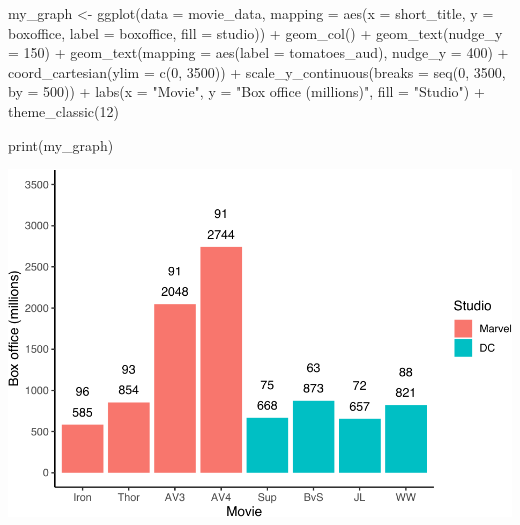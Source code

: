 \documentclass[
]{krantz}
\makeatletter
\newenvironment{Shaded}{\begin{snugshade}}{\end{snugshade}}
\newcommand{\AttributeTok}[1]{\textcolor[rgb]{0.61,0.61,0.61}{#1}}
\newcommand{\DecValTok}[1]{\textcolor[rgb]{0.06,0.06,0.06}{#1}}
\newcommand{\FunctionTok}[1]{\textcolor[rgb]{0,0,0}{#1}}
\newcommand{\NormalTok}[1]{#1}
\newcommand{\OtherTok}[1]{\textcolor[rgb]{0.37,0.37,0.37}{#1}}
\newcommand{\SpecialCharTok}[1]{\textcolor[rgb]{0,0,0}{#1}}
\newcommand{\StringTok}[1]{\textcolor[rgb]{0.5,0.5,0.5}{#1}}
\newenvironment{kframe}{%
\medskip{}
\setlength{\fboxsep}{.8em}
 \def\at@end@of@kframe{}%
 \ifinner\ifhmode%
  \def\at@end@of@kframe{\end{minipage}}%
  \begin{minipage}{\columnwidth}%
 \fi\fi%
 \def\FrameCommand##1{\hskip\@totalleftmargin \hskip-\fboxsep
 \colorbox{shadecolor}{##1}\hskip-\fboxsep
     \hskip-\linewidth \hskip-\@totalleftmargin \hskip\columnwidth}%
 \MakeFramed {\advance\hsize-\width
   \@totalleftmargin\z@ \linewidth\hsize
   \@setminipage}}%
 {\par\unskip\endMakeFramed%
 \at@end@of@kframe}
\renewenvironment{Shaded}{\begin{kframe}}{\end{kframe}}
\makeatother
\begin{document}
\begin{Shaded}
\begin{Highlighting}[]
\NormalTok{my\_graph }\OtherTok{\textless{}{-}} \FunctionTok{ggplot}\NormalTok{(}\AttributeTok{data =}\NormalTok{ movie\_data,}
           \AttributeTok{mapping =} \FunctionTok{aes}\NormalTok{(}\AttributeTok{x =}\NormalTok{ short\_title,}
                         \AttributeTok{y =}\NormalTok{ boxoffice,}
                         \AttributeTok{label =}\NormalTok{ boxoffice, }
                         \AttributeTok{fill =}\NormalTok{ studio)) }\SpecialCharTok{+}
  \FunctionTok{geom\_col}\NormalTok{() }\SpecialCharTok{+}
  \FunctionTok{geom\_text}\NormalTok{(}\AttributeTok{nudge\_y =} \DecValTok{150}\NormalTok{)  }\SpecialCharTok{+}
  \FunctionTok{geom\_text}\NormalTok{(}\AttributeTok{mapping =} \FunctionTok{aes}\NormalTok{(}\AttributeTok{label =}\NormalTok{ tomatoes\_aud), }
            \AttributeTok{nudge\_y =} \DecValTok{400}\NormalTok{) }\SpecialCharTok{+}
  \FunctionTok{coord\_cartesian}\NormalTok{(}\AttributeTok{ylim =} \FunctionTok{c}\NormalTok{(}\DecValTok{0}\NormalTok{, }\DecValTok{3500}\NormalTok{)) }\SpecialCharTok{+}
  \FunctionTok{scale\_y\_continuous}\NormalTok{(}\AttributeTok{breaks =} \FunctionTok{seq}\NormalTok{(}\DecValTok{0}\NormalTok{, }\DecValTok{3500}\NormalTok{, }\AttributeTok{by =} \DecValTok{500}\NormalTok{)) }\SpecialCharTok{+}
  \FunctionTok{labs}\NormalTok{(}\AttributeTok{x =} \StringTok{"Movie"}\NormalTok{,}
       \AttributeTok{y =} \StringTok{"Box office (millions)"}\NormalTok{,}
       \AttributeTok{fill =} \StringTok{"Studio"}\NormalTok{) }\SpecialCharTok{+}
  \FunctionTok{theme\_classic}\NormalTok{(}\DecValTok{12}\NormalTok{)}

\FunctionTok{print}\NormalTok{(my\_graph)}
\end{Highlighting}
\end{Shaded}

\includegraphics[width=0.65\linewidth]{bookdown_files/figure-latex/unnamed-chunk-211-1}
\end{document}
